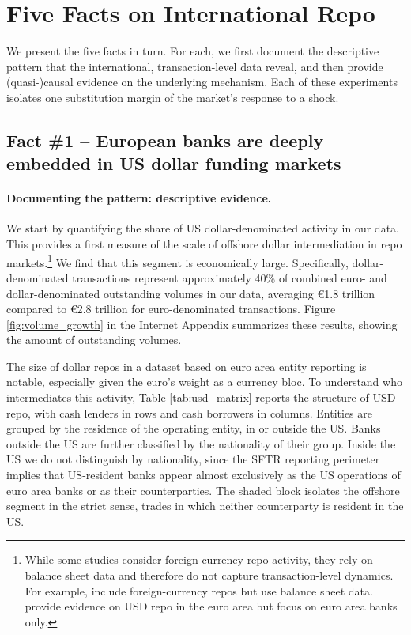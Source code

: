 \documentclass[english, 12pt, oneside]{article}
\begin{document}
\section{Five Facts on International Repo}
\label{section:fivefacts}

We present the five facts in turn. For each, we first document the descriptive pattern that the international, transaction-level data reveal, and then provide (quasi-)causal evidence on the underlying mechanism.
Each of these experiments isolates one substitution margin of the market's response to a shock.


\subsection[Fact \#1 -- European banks are deeply embedded in US dollar funding markets]{Fact \#1 -- European banks are deeply embedded in US dollar funding markets}

\paragraph{Documenting the pattern: descriptive evidence.}
We start by quantifying the share of US dollar-denominated activity in our data. This provides a first measure of the scale of offshore dollar intermediation in repo markets.\footnote{While some studies consider foreign-currency repo activity, they rely on balance sheet data and therefore do not capture transaction-level dynamics. For example, \citet{correa2025} include foreign-currency repos but use balance sheet data. \citet{klaus2024} provide evidence on USD repo in the euro area but focus on euro area banks only.} We find that this segment is economically large. Specifically, dollar-denominated transactions represent approximately 40\% of combined euro- and dollar-denominated outstanding volumes in our data, averaging \euro 1.8 trillion compared to \euro 2.8 trillion for euro-denominated transactions. Figure \ref{fig:volume_growth} in the Internet Appendix summarizes these results, showing the amount of outstanding volumes.

The size of dollar repos in a dataset based on euro area entity reporting is notable, especially given the euro's weight as a currency bloc. To understand who intermediates this activity, Table \ref{tab:usd_matrix} reports the structure of USD repo, with cash lenders in rows and cash borrowers in columns. Entities are grouped by the residence of the operating entity, in or outside the US. Banks outside the US are further classified by the nationality of their group. Inside the US we do not distinguish by nationality, since the SFTR reporting perimeter implies that US-resident banks appear almost exclusively as the US operations of euro area banks or as their counterparties. The shaded block isolates the offshore segment in the strict sense, trades in which neither counterparty is resident in the US.
\end{document}
